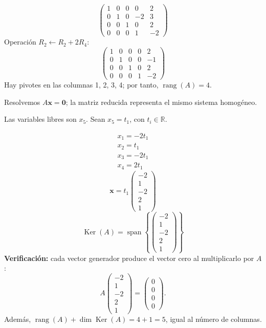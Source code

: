 \documentclass[12pt]{article}
\theoremstyle{remark}
\newcommand{\rang}{\operatorname{rang}}
\newcommand{\Ker}{\operatorname{Ker}}
\newcommand{\vect}[1]{\boldsymbol{#1}}
\begin{document}
\[
\begin{pmatrix}1&0&0&0&2\\0&1&0&-2&3\\0&0&1&0&2\\0&0&0&1&-2\end{pmatrix}
\]
Operación $R_{2}\leftarrow R_{2}+2R_{4}$:
\[
\begin{pmatrix}1&0&0&0&2\\0&1&0&0&-1\\0&0&1&0&2\\0&0&0&1&-2\end{pmatrix}
\]
Hay pivotes en las columnas 1, 2, 3, 4; por tanto, $\boxed{\rang(A)=4}$.

Resolvemos $A\vect x=\vect0$; la matriz reducida representa el mismo sistema homogéneo.

Las variables libres son $x_{5}$. Sean $x_{5}=t_{1}$, con $t_i\in\mathbb R$.

\[
\begin{aligned}x_{1}=- 2 t_{1}\\x_{2}=t_{1}\\x_{3}=- 2 t_{1}\\x_{4}=2 t_{1}\end{aligned}
\]
\[
\vect x=t_{1}\begin{pmatrix}-2\\1\\-2\\2\\1\end{pmatrix}
\]
\[
\boxed{\Ker(A)=\operatorname{span}\left\{\begin{pmatrix}-2\\1\\-2\\2\\1\end{pmatrix}\right\}}
\]
\textbf{Verificación:} cada vector generador produce el vector cero al multiplicarlo por $A$:
\[
A\begin{pmatrix}-2\\1\\-2\\2\\1\end{pmatrix}=\begin{pmatrix}0\\0\\0\\0\end{pmatrix}.
\]
Además, $\rang(A)+\dim\Ker(A)=4+1=5$, igual al número de columnas.


\medskip
\end{document}
